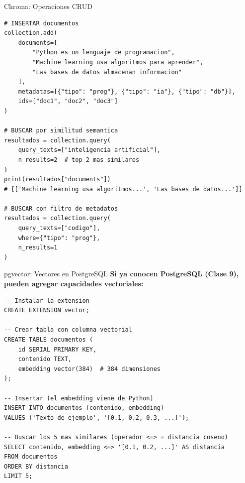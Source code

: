 \documentclass[aspectratio=169]{beamer}
\begin{document}
\begin{frame}[fragile]{Chroma: Operaciones CRUD}
\begin{lstlisting}[style=pythonstyle]
# INSERTAR documentos
collection.add(
    documents=[
        "Python es un lenguaje de programacion",
        "Machine learning usa algoritmos para aprender",
        "Las bases de datos almacenan informacion"
    ],
    metadatas=[{"tipo": "prog"}, {"tipo": "ia"}, {"tipo": "db"}],
    ids=["doc1", "doc2", "doc3"]
)

# BUSCAR por similitud semantica
resultados = collection.query(
    query_texts=["inteligencia artificial"],
    n_results=2  # top 2 mas similares
)
print(resultados["documents"])
# [['Machine learning usa algoritmos...', 'Las bases de datos...']]

# BUSCAR con filtro de metadatos
resultados = collection.query(
    query_texts=["codigo"],
    where={"tipo": "prog"},
    n_results=1
)
\end{lstlisting}
\end{frame}

\begin{frame}[fragile]{pgvector: Vectores en PostgreSQL}
    \textbf{Si ya conocen PostgreSQL (Clase 9), pueden agregar capacidades vectoriales:}
    
\begin{lstlisting}[style=sqlstyle]
-- Instalar la extension
CREATE EXTENSION vector;

-- Crear tabla con columna vectorial
CREATE TABLE documentos (
    id SERIAL PRIMARY KEY,
    contenido TEXT,
    embedding vector(384)  # 384 dimensiones
);

-- Insertar (el embedding viene de Python)
INSERT INTO documentos (contenido, embedding) 
VALUES ('Texto de ejemplo', '[0.1, 0.2, 0.3, ...]');

-- Buscar los 5 mas similares (operador <=> = distancia coseno)
SELECT contenido, embedding <=> '[0.1, 0.2, ...]' AS distancia
FROM documentos
ORDER BY distancia
LIMIT 5;
\end{lstlisting}
\end{frame}
\end{document}
